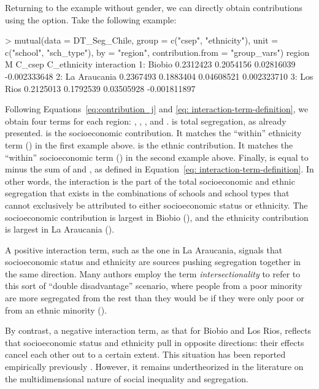Returning to the example without gender, we can directly obtain contributions using the \linebreak {} option. Take the following example:
\begin{example}
> mutual(data = DT_Seg_Chile,
         group = c("csep", "ethnicity"),
         unit = c("school", "sch_type"),
         by = "region",
         contribution.from = "group_vars")
         region         M    C_csep C_ethnicity  interaction
1:       Biobio 0.2312423 0.2054156  0.02816039 -0.002333648
2: La Araucania 0.2367493 0.1883404  0.04608521  0.002323710
3:     Los Rios 0.2125013 0.1792539  0.03505928 -0.001811897
\end{example}
Following Equations~\eqref{eq:contribution_j} and \eqref{eq: interaction-term-definition}, we obtain four terms for each region: , , , and .  is total segregation, as already presented.  is the socioeconomic contribution. It matches the ``within'' ethnicity term () in the first  example above.  is the ethnic contribution. It matches the ``within'' socioeconomic term () in the second  example above. Finally,  is equal to  minus the sum of  and , as defined in Equation~\eqref{eq: interaction-term-definition}. In other words, the interaction is the part of the total socioeconomic and ethnic segregation that exists in the combinations of schools and school types that cannot exclusively be attributed to either socioeconomic status or ethnicity. The socioeconomic contribution is largest in Biobio (), and the ethnicity contribution is largest in La Araucania ().

A positive interaction term, such as the one in La Araucania, signals that socioeconomic status and ethnicity are sources pushing segregation together in the same direction. Many authors employ the term \textit{intersectionality} to refer to this sort of ``double disadvantage'' scenario, where people from a poor minority are more segregated from the rest than they would be if they were only poor or from an ethnic minority (\citealp{crenshaw1990mapping}).

By contrast, a negative interaction term, as that for Biobio and Los Rios, reflects that socioeconomic status and ethnicity pull in opposite directions: their effects cancel each other out to a certain extent. This situation has been reported empirically previously \citep{guinea2015joint}. However, it remains undertheorized in the literature on the multidimensional nature of social inequality and segregation. 

